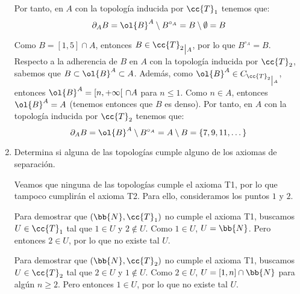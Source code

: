 \documentclass[12pt]{article}
\newcommand{\T}[0]{\cc{T}}
\begin{document}
\begin{ejercicio}[6 puntos]
\begin{enumerate}
            Por tanto, en $A$ con la topología inducida por $\T_1$ tenemos que:
            \begin{equation*}
                \partial_A B = \ol{B}^A\setminus B^{\circ_A} = B\setminus \emptyset = B
            \end{equation*}

            Como $B=[1,5]\cap A$, entonces $B\in {\T_2}_{\big| A}$, por lo que $B^{\circ_A} = B$.
            Respecto a la adherencia de $B$ en $A$ con la topología inducida por $\T_2$, sabemos que $B\subset \ol{B}^A\subset A$.
            Además, como $\ol{B}^A\in C_{{\T_2}_{\big| A}}$, entonces $\ol{B}^A=[n,+\infty[~\cap A$ para $n\leq 1$. Como $n\in A$, entonces $\ol{B}^A=A$ (tenemos entonces que $B$ es denso).
            Por tanto, en $A$ con la topología inducida por $\T_2$ tenemos que:
            \begin{equation*}
                \partial_A B = \ol{B}^A\setminus B^{\circ_A} = A\setminus B = \{7, 9, 11, \dots\}
            \end{equation*}


            \item Determina si alguna de las topologías cumple alguno de los axiomas de separación.
            
            Veamos que ninguna de las topologías cumple el axioma T1, por lo que tampoco cumplirán el axioma T2. Para ello, consideramos los puntos $1$ y $2$.

            Para demostrar que $(\bb{N}, \T_1)$ no cumple el axioma T1, buscamos $U\in \T_1$ tal que $1\in U$ y $2\notin U$. Como $1\in U$, $U=\bb{N}$. Pero entonces $2\in U$, por lo que no existe tal $U$.

            Para demostrar que $(\bb{N}, \T_2)$ no cumple el axioma T1, buscamos $U\in \T_2$ tal que $2\in U$ y $1\notin U$. Como $2\in U$, $U=[1,n]\cap \bb{N}$ para algún $n\geq 2$.
            Pero entonces $1\in U$, por lo que no existe tal $U$.
        \end{enumerate}
    \end{ejercicio}
\end{document}
